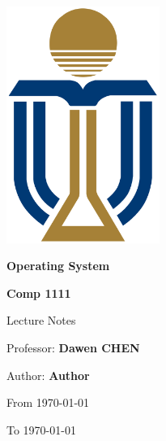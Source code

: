 \documentclass[12pt]{article}
\newcommand{\ClassName}{Operating System}
\newcommand{\Professor}{Dawen CHEN}
\newcommand{\ClassNum}{Comp 1111}
\newcommand{\Author}{Author}
\begin{document}
\begin{titlepage}
    \centering
    \includegraphics[width=5cm]{UST.png}
    \par
    \vspace{1cm}
    {\Huge \bfseries \ClassName \par}
    {\Huge \bfseries \ClassNum \par}
    \vspace{1cm}
    {\Large Lecture Notes \par}
    \vspace{1cm}
    {\large Professor: \textbf{\Professor} \par}
    \vspace{0.5cm}
    {\large Author: \textbf{\Author} \par}
    \vfill
    {\large From \today \par}
    \vspace{0.5cm}
    {\large To \today \par}
\end{titlepage}
\end{document}
